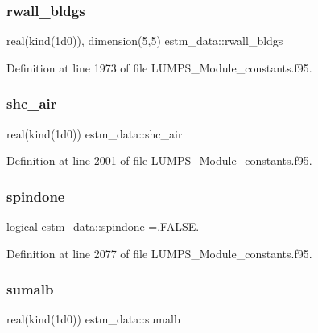\subsubsection{\texorpdfstring{rwall\+\_\+bldgs}{rwall\_bldgs}}
{\footnotesize\ttfamily real(kind(1d0)), dimension(5,5) estm\+\_\+data\+::rwall\+\_\+bldgs}



Definition at line 1973 of file L\+U\+M\+P\+S\+\_\+\+Module\+\_\+constants.\+f95.

\mbox{\label{namespaceestm__data_a7a061270d21a36b76485b8f10b9e2180}} 
\subsubsection{\texorpdfstring{shc\+\_\+air}{shc\_air}}
{\footnotesize\ttfamily real(kind(1d0)) estm\+\_\+data\+::shc\+\_\+air}



Definition at line 2001 of file L\+U\+M\+P\+S\+\_\+\+Module\+\_\+constants.\+f95.

\mbox{\label{namespaceestm__data_af824dcc2de6123a45bb4267b0c55c56c}} 
\subsubsection{\texorpdfstring{spindone}{spindone}}
{\footnotesize\ttfamily logical estm\+\_\+data\+::spindone =.F\+A\+L\+S\+E.}



Definition at line 2077 of file L\+U\+M\+P\+S\+\_\+\+Module\+\_\+constants.\+f95.

\mbox{\label{namespaceestm__data_af4bbbc09fb07fc02a62aa10ef9b0fc50}} 
\subsubsection{\texorpdfstring{sumalb}{sumalb}}
{\footnotesize\ttfamily real(kind(1d0)) estm\+\_\+data\+::sumalb}



